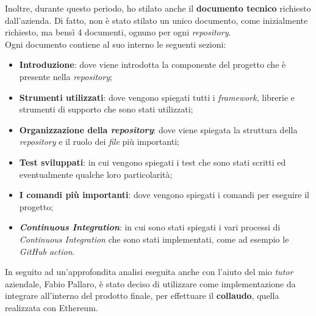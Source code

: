 Inoltre, durante questo periodo, ho stilato anche il \textbf{documento tecnico} richiesto dall'azienda. Di fatto, non è stato stilato un unico documento, come inizialmente richiesto, ma bensì 4 documenti, ognuno per ogni \textit{repository}. \\

\noindent Ogni documento contiene al suo interno le seguenti sezioni:
\begin{itemize}
  \item \textbf{Introduzione}: dove viene introdotta la componente del progetto che è presente nella \textit{repository};
  \item \textbf{Strumenti utilizzati}: dove vengono spiegati tutti i \textit{framework}, librerie e strumenti di supporto che sono stati utilizzati;
  \item \textbf{Organizzazione della \textit{repository}}: dove viene spiegata la struttura della \textit{repository} e il ruolo dei \textit{file} più importanti;
  \item \textbf{Test sviluppati}: in cui vengono spiegati i test che sono stati scritti ed eventualmente qualche loro particolarità;
  \item \textbf{I comandi più importanti}: dove vengono spiegati i comandi per eseguire il progetto;
  \item \textbf{\textit{Continuous Integration}}: in cui sono stati spiegati i vari processi di \textit{Continuous Integration} che sono stati implementati, come ad esempio le \textit{GitHub action}.
\end{itemize}

In seguito ad un'approfondita analisi eseguita anche con l'aiuto del mio \textit{tutor} aziendale, Fabio Pallaro, è stato deciso di utilizzare come implementazione da integrare all'interno del prodotto finale, per effettuare il \textbf{collaudo}, quella realizzata con Ethereum.

